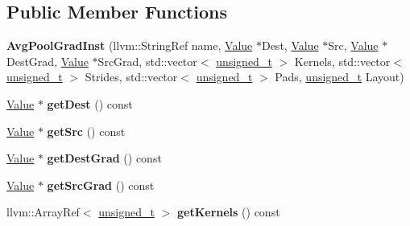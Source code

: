 \subsection*{Public Member Functions}
\begin{DoxyCompactItemize}
\item 
\mbox{\label{classglow_1_1_avg_pool_grad_inst_a853dd5ec14555cd291d5e958459ecce8}} 
{\bfseries Avg\+Pool\+Grad\+Inst} (llvm\+::\+String\+Ref name, \hyperlink{classglow_1_1_value}{Value} $\ast$Dest, \hyperlink{classglow_1_1_value}{Value} $\ast$Src, \hyperlink{classglow_1_1_value}{Value} $\ast$Dest\+Grad, \hyperlink{classglow_1_1_value}{Value} $\ast$Src\+Grad, std\+::vector$<$ \hyperlink{namespaceglow_a0ca574644e1e42ef193a9947fb4d8911}{unsigned\+\_\+t} $>$ Kernels, std\+::vector$<$ \hyperlink{namespaceglow_a0ca574644e1e42ef193a9947fb4d8911}{unsigned\+\_\+t} $>$ Strides, std\+::vector$<$ \hyperlink{namespaceglow_a0ca574644e1e42ef193a9947fb4d8911}{unsigned\+\_\+t} $>$ Pads, \hyperlink{namespaceglow_a0ca574644e1e42ef193a9947fb4d8911}{unsigned\+\_\+t} Layout)
\item 
\mbox{\label{classglow_1_1_avg_pool_grad_inst_ad442e82ad99f87c33d64ab6b9a0fcc51}} 
\hyperlink{classglow_1_1_value}{Value} $\ast$ {\bfseries get\+Dest} () const
\item 
\mbox{\label{classglow_1_1_avg_pool_grad_inst_ab2ba93651a76cb9da87a557e997fecf0}} 
\hyperlink{classglow_1_1_value}{Value} $\ast$ {\bfseries get\+Src} () const
\item 
\mbox{\label{classglow_1_1_avg_pool_grad_inst_a208ce11d4254265d644d6d6e2d4e9e5d}} 
\hyperlink{classglow_1_1_value}{Value} $\ast$ {\bfseries get\+Dest\+Grad} () const
\item 
\mbox{\label{classglow_1_1_avg_pool_grad_inst_ae10c05395d59469e2a63122fbd034bcf}} 
\hyperlink{classglow_1_1_value}{Value} $\ast$ {\bfseries get\+Src\+Grad} () const
\item 
\mbox{\label{classglow_1_1_avg_pool_grad_inst_a44c4d337b7c86c36f5c5c394e19eec78}} 
llvm\+::\+Array\+Ref$<$ \hyperlink{namespaceglow_a0ca574644e1e42ef193a9947fb4d8911}{unsigned\+\_\+t} $>$ {\bfseries get\+Kernels} () const

\end{DoxyCompactItemize}
